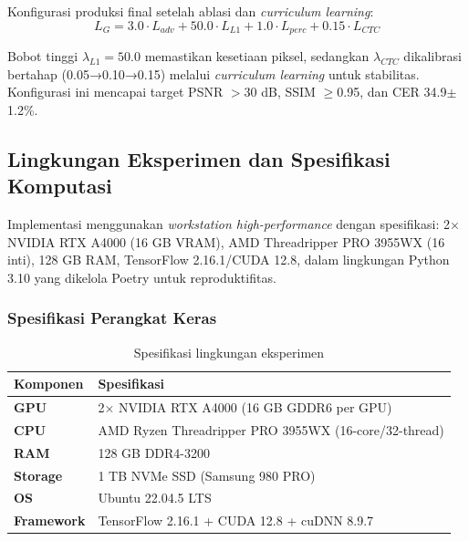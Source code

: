 \documentclass[12pt,a4paper]{book}
\begin{document}
Konfigurasi produksi final setelah ablasi dan \textit{curriculum learning}:
\begin{equation}
\boxed{L_G = 3.0 \cdot L_{adv} + 50.0 \cdot L_{L1} + 1.0 \cdot L_{perc} + 0.15 \cdot L_{CTC}}
\end{equation}

Bobot tinggi $\lambda_{L1}=50.0$ memastikan kesetiaan piksel, sedangkan $\lambda_{CTC}$ dikalibrasi bertahap (0.05→0.10→0.15) melalui \textit{curriculum learning} untuk stabilitas. Konfigurasi ini mencapai target PSNR $>$30 dB, SSIM $\geq$0.95, dan CER 34.9$\pm$1.2\%.

\subsection{Lingkungan Eksperimen dan Spesifikasi Komputasi}
\label{subsec:spesifikasi-lingkungan}

Implementasi menggunakan \textit{workstation high-performance} dengan spesifikasi: 2$\times$ NVIDIA RTX A4000 (16 GB VRAM), AMD Threadripper PRO 3955WX (16 inti), 128 GB RAM, TensorFlow 2.16.1/CUDA 12.8, dalam lingkungan Python 3.10 yang dikelola Poetry untuk reproduktifitas.

\subsubsection{Spesifikasi Perangkat Keras}
\label{subsubsec:hardware-spec}

\begin{table}[H]
\centering
\caption{Spesifikasi lingkungan eksperimen}
\label{tab:hardware-specs-actual}
\small
\begin{tabular}{|l|l|}
\hline
\textbf{Komponen} & \textbf{Spesifikasi} \\
\hline
\textbf{GPU} & 2$\times$ NVIDIA RTX A4000 (16 GB GDDR6 per GPU) \\
\hline
\textbf{CPU} & AMD Ryzen Threadripper PRO 3955WX (16-core/32-thread) \\
\hline
\textbf{RAM} & 128 GB DDR4-3200 \\
\hline
\textbf{Storage} & 1 TB NVMe SSD (Samsung 980 PRO) \\
\hline
\textbf{OS} & Ubuntu 22.04.5 LTS \\
\hline
\textbf{Framework} & TensorFlow 2.16.1 + CUDA 12.8 + cuDNN 8.9.7 \\
\hline
\end{tabular}
\end{table}
\end{document}
